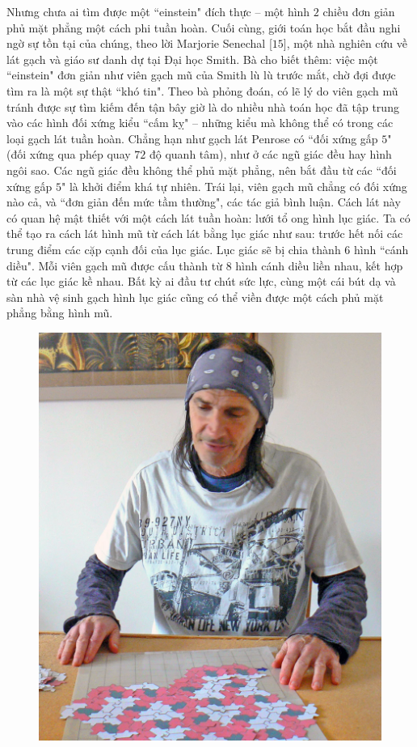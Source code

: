 \begin{multicols}{2}
	\vskip 0.1cm
	Nhưng chưa ai tìm được một ``einstein" đích thực -- một hình $2$ chiều đơn giản phủ mặt phẳng một cách phi tuần hoàn. Cuối cùng, giới toán học bắt đầu nghi ngờ sự tồn tại của chúng, theo lời Marjorie Senechal [$15$], một nhà nghiên cứu về lát gạch và giáo sư danh dự tại Đại học Smith. Bà cho biết thêm: việc một ``einstein" đơn giản như viên gạch mũ của Smith lù lù trước mắt, chờ đợi được tìm ra là một sự thật ``khó tin". 
	\vskip 0.1cm
	Theo bà phỏng đoán, có lẽ lý do viên gạch mũ tránh được sự tìm kiếm đến tận bây giờ là do nhiều nhà toán học đã tập trung vào các hình đối xứng kiểu ``cấm kỵ" -- những kiểu mà không thể có trong các loại gạch lát tuần hoàn. Chẳng hạn như gạch lát Penrose có ``đối xứng gấp $5$" (đối xứng qua phép quay $72$ độ quanh tâm), như ở các ngũ giác đều hay hình ngôi sao. Các ngũ giác đều không thể phủ mặt phẳng, nên bắt đầu từ các ``đối xứng gấp $5$" là khởi điểm khá tự nhiên. 
	\vskip 0.1cm
	Trái lại, viên gạch mũ chẳng có đối xứng nào cả, và ``đơn giản đến mức tầm thường", các tác giả bình luận. Cách lát này có quan hệ mật thiết với một cách lát tuần hoàn: lưới tổ ong hình lục giác. Ta có thể tạo ra cách lát hình mũ từ cách lát bằng lục giác như sau: trước hết nối các trung điểm các cặp cạnh đối của lục giác. Lục giác sẽ bị chia thành 6 hình ``cánh diều". Mỗi viên gạch mũ được cấu thành từ $8$ hình cánh diều liền nhau, kết hợp từ các lục giác kề nhau. Bất kỳ ai đầu tư chút sức lực, cùng một cái bút dạ và sàn nhà vệ sinh gạch hình lục giác cũng có thể viền được một cách phủ mặt phẳng bằng hình mũ.  
	\begin{figure}[H]
		\vspace*{-5pt}
		\centering
		\captionsetup{labelformat= empty, justification=centering}
		\includegraphics[width= 1\linewidth]{2}

\end{figure}
\end{multicols}
